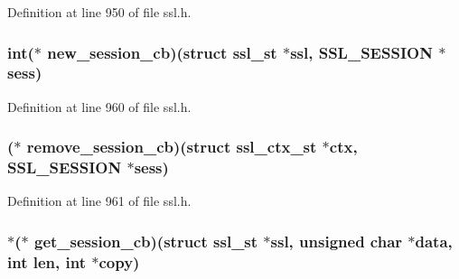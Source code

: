 Definition at line 950 of file ssl.\+h.

\subsubsection[{\texorpdfstring{new\+\_\+session\+\_\+cb}{new_session_cb}}]{\setlength{\rightskip}{0pt plus 5cm}int($\ast$ new\+\_\+session\+\_\+cb)(struct {\bf ssl\+\_\+st} $\ast$ssl, {\bf S\+S\+L\+\_\+\+S\+E\+S\+S\+I\+ON} $\ast$sess)}\hypertarget{structssl__ctx__st_a3961afac5a775516a8cc4f3721a8e1eb}{}\label{structssl__ctx__st_a3961afac5a775516a8cc4f3721a8e1eb}


Definition at line 960 of file ssl.\+h.

\subsubsection[{\texorpdfstring{remove\+\_\+session\+\_\+cb}{remove_session_cb}}]{($\ast$ remove\+\_\+session\+\_\+cb)(struct {\bf ssl\+\_\+ctx\+\_\+st} $\ast$ctx, {\bf S\+S\+L\+\_\+\+S\+E\+S\+S\+I\+ON} $\ast$sess)}\hypertarget{structssl__ctx__st_a668d9020bff2b3dd5d4094964c3bf9a7}{}\label{structssl__ctx__st_a668d9020bff2b3dd5d4094964c3bf9a7}


Definition at line 961 of file ssl.\+h.

\subsubsection[{\texorpdfstring{get\+\_\+session\+\_\+cb}{get_session_cb}}]{ $\ast$($\ast$ get\+\_\+session\+\_\+cb)(struct {\bf ssl\+\_\+st} $\ast$ssl, unsigned char $\ast$data, int {\bf len}, int $\ast$copy)}\hypertarget{structssl__ctx__st_aa8c8ffa3b89d9b23f825cad12307d13a}{}\label{structssl__ctx__st_aa8c8ffa3b89d9b23f825cad12307d13a}


